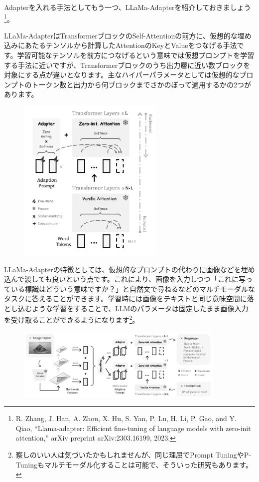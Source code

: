 \documentclass[a5paper,twoside,dvipdfmx]{jsarticle}
\begin{document}
Adapterを入れる手法としてもう一つ、LLaMa-Adapterを紹介しておきましょう\footnote{R. Zhang, J. Han, A. Zhou, X. Hu, S. Yan, P. Lu, H. Li, P. Gao, and Y. Qiao, “Llama-adapter: Efficient fine-tuning of language models with zero-init attention,” arXiv preprint arXiv:2303.16199, 2023.}。

\newpage

LLaMa-AdapterはTransformerブロックのSelf-Attentionの前方に、仮想的な埋め込みにあたるテンソルから計算したAttentionのKeyとValueをつなげる手法です。学習可能なテンソルを前方につなげるという意味では仮想プロンプトを学習する手法に近いですが、Transformerブロックのうち出力層に近い数ブロックを対象にする点が違いとなります。主なハイパーパラメータとしては仮想的なプロンプトのトークン数と出力から何ブロックまでさかのぼって適用するかの2つがあります。


\begin{figure}[h]
  \centering
  \includegraphics[width=70mm]{../C105Fig/gray/llama_adapter_image.png}
 \end{figure} 

 \newpage

LLaMa-Adapterの特徴としては、仮想的なプロンプトの代わりに画像などを埋め込んで渡しても良いという点です。これにより、画像を入力しつつ「これに写っている標識はどういう意味ですか？」と自然文で尋ねるなどのマルチモーダルなタスクに答えることができます。学習時には画像をテキストと同じ意味空間に落とし込むような学習をすることで、LLMのパラメータは固定したまま画像入力を受け取ることができるようになります\footnote{察しのいい人は気づいたかもしれませんが、同じ理屈でPrompt TuningやP-Tuningもマルチモーダル化することは可能で、そういった研究もあります。}。


\begin{figure}[h]
  \centering
  \includegraphics[width=100mm]{../C105Fig/gray/llama_adapter_image2.png}
 \end{figure} 
\end{document}
